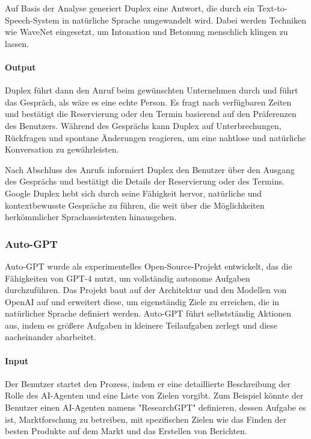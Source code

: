 \documentclass[conference]{IEEEtran}
\begin{document}
Auf Basis der Analyse generiert Duplex eine Antwort, die durch ein Text-to-Speech-System in natürliche Sprache umgewandelt wird. Dabei werden Techniken wie WaveNet eingesetzt, um Intonation und Betonung menschlich klingen zu lassen.

\paragraph{Output} Duplex führt dann den Anruf beim gewünschten Unternehmen durch und führt das Gespräch, als wäre es eine echte Person. Es fragt nach verfügbaren Zeiten und bestätigt die Reservierung oder den Termin basierend auf den Präferenzen des Benutzers. Während des Gesprächs kann Duplex auf Unterbrechungen, Rückfragen und spontane Änderungen reagieren, um eine nahtlose und natürliche Konversation zu gewährleisten.

Nach Abschluss des Anrufs informiert Duplex den Benutzer über den Ausgang des Gesprächs und bestätigt die Details der Reservierung oder des Termins. Google Duplex hebt sich durch seine Fähigkeit hervor, natürliche und kontextbewusste Gespräche zu führen, die weit über die Möglichkeiten herkömmlicher Sprachassistenten hinausgehen.
\cite{noauthor_google_nodate}

\subsubsection{Auto-GPT}
Auto-GPT wurde als experimentelles Open-Source-Projekt entwickelt, das die Fähigkeiten von GPT-4 nutzt, um vollständig autonome Aufgaben durchzuführen. Das Projekt baut auf der Architektur und den Modellen von OpenAI auf und erweitert diese, um eigenständig Ziele zu erreichen, die in natürlicher Sprache definiert werden. Auto-GPT führt selbstständig Aktionen aus, indem es größere Aufgaben in kleinere Teilaufgaben zerlegt und diese nacheinander abarbeitet.

\paragraph{Input} Der Benutzer startet den Prozess, indem er eine detaillierte Beschreibung der Rolle des AI-Agenten und eine Liste von Zielen vorgibt. Zum Beispiel könnte der Benutzer einen AI-Agenten namens "ResearchGPT" definieren, dessen Aufgabe es ist, Marktforschung zu betreiben, mit spezifischen Zielen wie das Finden der besten Produkte auf dem Markt und das Erstellen von Berichten. \cite{noauthor_papers_nodate}
\end{document}
